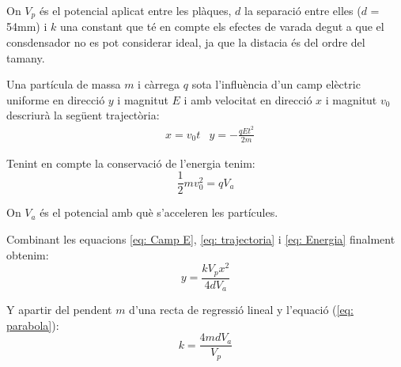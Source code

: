 \documentclass[11pt]{article}
\begin{document}
On $V_p$ és el potencial aplicat entre les plàques, $d$ la separació entre elles ($d$ = 54mm) i $k$ una constant que té en compte els efectes de varada degut a que el consdensador no es pot considerar ideal, ja que la distacia és del ordre del tamany.

Una partícula de massa $m$ i càrrega $q$ sota l'influència d'un camp elèctric uniforme en direcció $y$ i magnitut $E$ i amb velocitat en direcció $x$ i magnitut $v_0$ descriurà la següent trajectòria:
\begin{align}
    &x = v_0 t      &y = -\frac{qEt^2}{2m}
    \label{eq: trajectoria}
\end{align}

Tenint en compte la conservació de l'energia tenim:
\begin{equation}
    \frac{1}{2}mv_0^2=qV_a
    \label{eq: Energia}
\end{equation}

On $V_a$ és el potencial amb què s'acceleren les partícules.

Combinant les equacions \ref{eq: Camp E}, \ref{eq: trajectoria} i \ref{eq: Energia} finalment obtenim:
\begin{equation}
    y = \frac{kV_px^2}{4dV_a}
    \label{eq: parabola}
\end{equation}

Y apartir del pendent $m$ d'una recta de regressió lineal y l'equació (\ref{eq: parabola}):
 \begin{equation}
      k =\frac{4mdV_a}{V_p}
      \label{eq: k}
 \end{equation}

\vspace{1cm}
\end{document}
